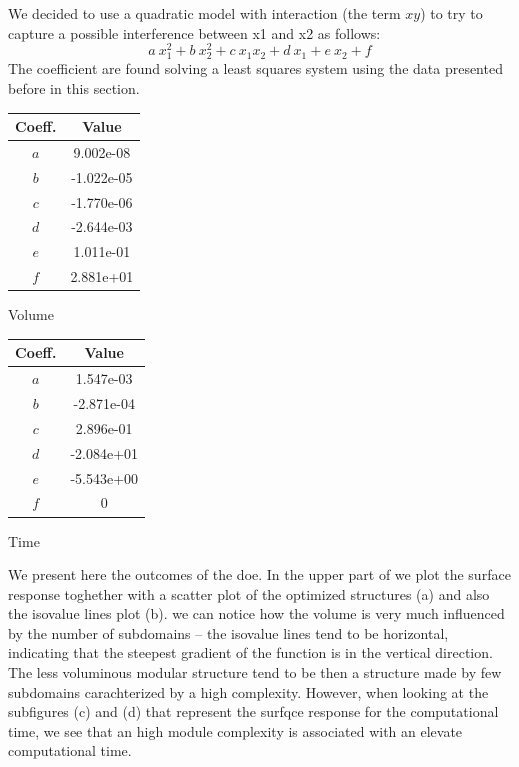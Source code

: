 We decided to use a quadratic model with interaction (the term $xy$) to try to capture a possible interference between x1 and x2 as follows:
\begin{equation}
    a\:x_1^2+b\:x_2^2+c\:x_1x_2+d\:x_1+e\:x_2+f
\end{equation}
The coefficient are found solving a least squares system using the data presented before in this section.

\begin{margintable}
    \small
    \centering
    \begin{tabular}{cS[table-number-alignment = center, table-format = 1.2e1]}
    \toprule
    \textbf{Coeff.} & {\textbf{Value}} \\ \midrule
    $a$ & 9.002e-08    \\
    $b$ &  -1.022e-05   \\
    $c$ &  -1.770e-06   \\
    $d$ &  -2.644e-03   \\
    $e$ &   1.011e-01  \\
    $f$ &   2.881e+01  \\
    \bottomrule
    \end{tabular}
    \caption{Volume}
    \label{tab:05_doe_coeff_v}
\end{margintable}

\begin{margintable}
    \small
    \centering
    \begin{tabular}{cS[table-number-alignment = center, table-format = 1.2e1]}
    \toprule
    \textbf{Coeff.} & {\textbf{Value}} \\ \midrule
    $a$ & 1.547e-03    \\
    $b$ & -2.871e-04    \\
    $c$ &  2.896e-01   \\
    $d$ &  -2.084e+01   \\
    $e$ &  -5.543e+00   \\
    $f$ & 0    \\
    \bottomrule
    \end{tabular}
    \caption{Time}
    \label{tab:05_doe_coeff_t}
\end{margintable}
We present here the outcomes of the \gls{doe}. In the upper part of  we plot the surface response toghether with a scatter plot of the optimized structures (a) and also the isovalue lines plot (b). we can notice how the volume is very much influenced by the number of subdomains -- the isovalue lines tend to be horizontal, indicating that the steepest gradient of the function is in the vertical direction. The less voluminous modular structure tend to be then a structure made by few subdomains carachterized by a high complexity. However, when looking at the subfigures (c) and (d) that represent the surfqce response for the computational time, we see that an high module complexity is associated with an elevate computational time.

